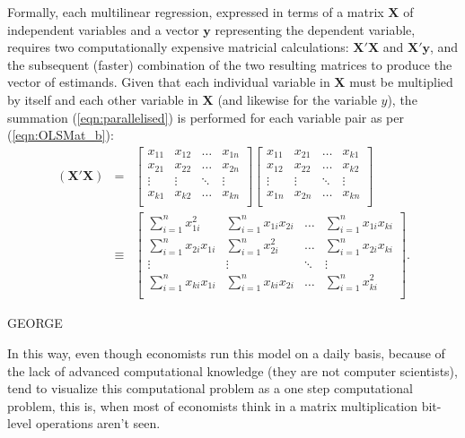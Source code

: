 \documentclass{article}[11pt,subeqn]
\newcommand{\vect}[1]{\mathbf{#1}}
\begin{document}
\begin{spacing}{1.25}
Formally, each multilinear regression, expressed in terms of a matrix $\vect{X}$ of independent variables and a vector $\vect{y}$ representing the 
dependent variable, requires two computationally expensive matricial calculations: $\vect{X'X}$ and $\vect{X'y}$, and the subsequent (faster) combination
of the two resulting matrices to produce the vector of estimands. Given that each individual variable in $\vect{X}$ must be multiplied by itself and
each other variable in $\vect{X}$ (and likewise for the variable $y$), the summation (\ref{eqn:parallelised}) is performed for each variable pair as
per (\ref{eqn:OLSMat_b}):
\begin{subequations}
\begin{eqnarray}
\label{eqn:OLSMat}
\vect{(X'X)}&=& %
\begin{bmatrix}
x_{11} &  x_{12} & \ldots & x_{1n}\\
x_{21} &  x_{22} & \ldots & x_{2n}\\
\vdots & \vdots  & \ddots &  \vdots\\
x_{k1} &  x_{k2} & \ldots & x_{kn}\\
\end{bmatrix}%
\begin{bmatrix}
x_{11} &  x_{21} & \ldots & x_{k1}\\
x_{12} &  x_{22} & \ldots & x_{k2}\\
\vdots & \vdots  & \ddots &  \vdots\\
x_{1n} &  x_{2n} & \ldots & x_{kn}\\
\end{bmatrix}\\ \label{eqn:OLSMat_a}
&\equiv&
\begin{bmatrix}
\sum^n_{i=1}x^2_{1i} &  \sum^n_{i=1}x_{1i}x_{2i} & \ldots & \sum^n_{i=1}x_{1i}x_{ki}\\
\sum^n_{i=1}x_{2i}x_{1i} &  \sum^n_{i=1}x^2_{2i} & \ldots & \sum^n_{i=1}x_{2i}x_{ki}\\
\vdots & \vdots  & \ddots &  \vdots\\
\sum^n_{i=1}x_{ki}x_{1i} &  \sum^n_{i=1}x_{ki}x_{2i} & \ldots & \sum^n_{i=1}x^2_{ki}\\
\end{bmatrix}. \label{eqn:OLSMat_b}
\end{eqnarray}
\end{subequations}

GEORGE

In this way, even though economists run this model on a daily basis, because of the lack of advanced computational knowledge (they are not computer scientists), tend to visualize this computational problem as a one step computational problem, this is, when most of economists think in a matrix multiplication bit-level operations aren't seen.


\end{spacing}
\end{document}
